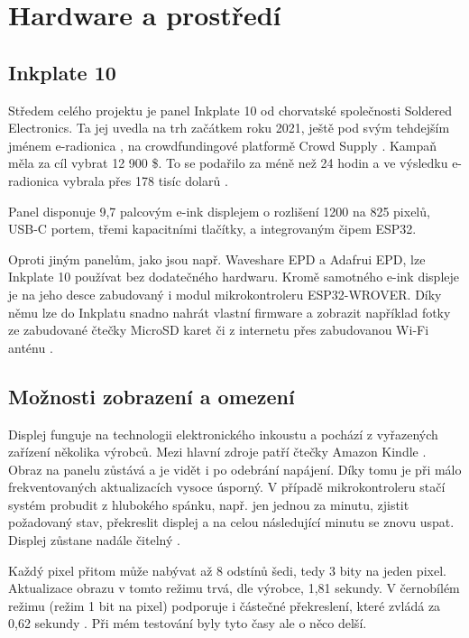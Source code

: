 \chapter{Hardware a prostředí}

\section{Inkplate 10}
Středem celého projektu je panel Inkplate 10 od chorvatské společnosti Soldered Electronics. Ta jej uvedla na trh začátkem roku 2021, ještě pod svým tehdejším jménem e-radionica \cite{solderedelectronicsUs}, na crowdfundingové platformě Crowd Supply \cite{zovkoOurCampaignLive2021}.
Kampaň měla za cíl vybrat 12 900 \$. To se podařilo za méně než 24 hodin \cite{crowdsupplyna[@crowd_supply]NewCampaignLaunched2021} a ve výsledku e-radionica vybrala přes 178 tisíc dolarů \cite{solderedelectronicsInkplate102021}.

Panel disponuje 9,7 palcovým e-ink displejem o rozlišení 1200 na 825 pixelů, USB-C portem, třemi kapacitními tlačítky, a integrovaným čipem ESP32.

Oproti jiným panelům, jako jsou např. Waveshare EPD a Adafrui EPD, lze Inkplate 10 používat bez dodatečného hardwaru. Kromě samotného e-ink displeje je na jeho desce zabudovaný i modul mikrokontroleru ESP32-WROVER. Díky němu lze do Inkplatu snadno nahrát vlastní firmware a zobrazit například fotky ze zabudované čtečky MicroSD karet či z internetu přes zabudovanou Wi-Fi anténu \cite{solderedelectronicsInkplate102021}.

\section{Možnosti zobrazení a omezení}

Displej funguje na technologii elektronického inkoustu a pochází z vyřazených zařízení několika výrobců. Mezi hlavní zdroje patří čtečky Amazon Kindle \cite{solderedelectronicsInkplate102021}. Obraz na panelu zůstává a je vidět i po odebrání napájení. Díky tomu je při málo frekventovaných aktualizacích vysoce úsporný. V případě mikrokontroleru stačí systém probudit z hlubokého spánku, např. jen jednou za minutu, zjistit požadovaný stav, překreslit displej a na celou následující minutu se znovu uspat. Displej zůstane nadále čitelný \cite{heikenfeldReviewPaperCritical2011}.

Každý pixel přitom může nabývat až 8 odstínů šedi, tedy 3 bity na jeden pixel. Aktualizace obrazu v tomto režimu trvá, dle výrobce, 1,81 sekundy.
V černobílém režimu (režim 1 bit na pixel) podporuje i částečné překreslení, které zvládá za 0,62 sekundy \cite{solderedelectronicsInkplate102021}. Při mém testování byly tyto časy ale o něco delší.

